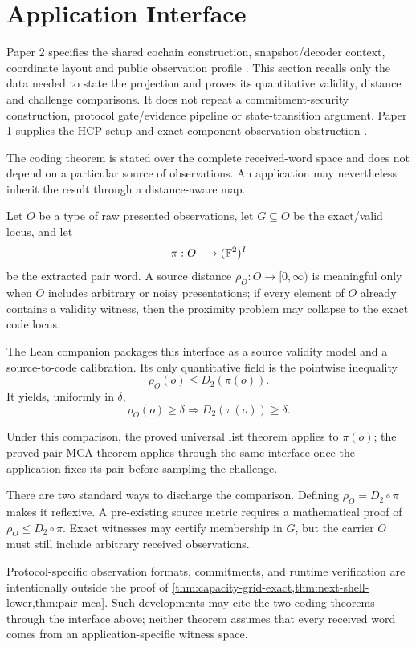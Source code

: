 \section{Application Interface}

Paper 2 specifies the shared cochain construction, snapshot/decoder context,
coordinate layout and public observation profile
\cite{vanDerVlugt2026protocol}. This section recalls only the data needed to
state the projection and proves its quantitative validity, distance and
challenge comparisons. It does not repeat a commitment-security construction,
protocol gate/evidence pipeline or state-transition argument. Paper 1 supplies
the HCP setup and exact-component observation obstruction
\cite{vanDerVlugt2026hcp}.

The coding theorem is stated over the complete received-word space and does not
depend on a particular source of observations.  An application may nevertheless
inherit the result through a distance-aware map.

Let \(O\) be a type of raw presented observations, let
\(G\subseteq O\) be the exact/valid locus, and let
\[
  \pi:O\longrightarrow(\mathbb{F}^2)^I
\]
be the extracted pair word.  A source distance
\(\rho_O:O\to[0,\infty)\) is meaningful only when \(O\) includes arbitrary or noisy
presentations; if every element of \(O\) already contains a validity witness,
then the proximity problem may collapse to the exact code locus.

The Lean companion packages this interface as a source validity model and a
source-to-code calibration.  Its only quantitative field is the pointwise
inequality
\[
  \rho_O(o)\le D_2(\pi(o)).
\]
It yields, uniformly in \(\delta\),
\[
  \rho_O(o)\ge\delta
  \Longrightarrow
  D_2(\pi(o))\ge\delta.
\]

Under this comparison, the proved universal list theorem applies to
\(\pi(o)\); the proved pair-MCA theorem applies through the same interface
once the application fixes its pair before sampling the challenge.

There are two standard ways to discharge the comparison. Defining
\(\rho_O=D_2\circ\pi\) makes it reflexive. A pre-existing source
metric requires a mathematical proof of
\(\rho_O\le D_2\circ\pi\).  Exact witnesses may certify membership in \(G\),
but the carrier \(O\) must still include arbitrary received observations.

Protocol-specific observation formats, commitments, and runtime verification
are intentionally outside the proof of
\cref{thm:capacity-grid-exact,thm:next-shell-lower,thm:pair-mca}.
Such developments may cite the two coding theorems through the interface
above; neither theorem assumes that every received word comes from an
application-specific witness space.

